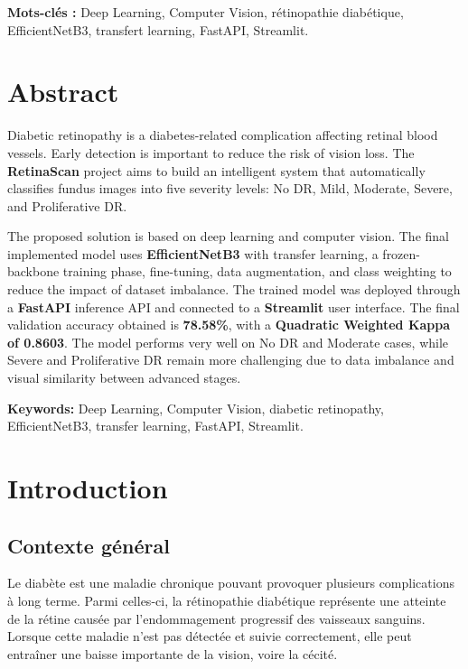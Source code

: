 \documentclass[12pt,a4paper]{report}
\begin{document}
\textbf{Mots-clés :} Deep Learning, Computer Vision, rétinopathie diabétique, EfficientNetB3, transfert learning, FastAPI, Streamlit.

\chapter*{Abstract}
Diabetic retinopathy is a diabetes-related complication affecting retinal blood vessels. Early detection is important to reduce the risk of vision loss. The \textbf{RetinaScan} project aims to build an intelligent system that automatically classifies fundus images into five severity levels: No DR, Mild, Moderate, Severe, and Proliferative DR.

The proposed solution is based on deep learning and computer vision. The final implemented model uses \textbf{EfficientNetB3} with transfer learning, a frozen-backbone training phase, fine-tuning, data augmentation, and class weighting to reduce the impact of dataset imbalance. The trained model was deployed through a \textbf{FastAPI} inference API and connected to a \textbf{Streamlit} user interface. The final validation accuracy obtained is \textbf{78.58\%}, with a \textbf{Quadratic Weighted Kappa of 0.8603}. The model performs very well on No DR and Moderate cases, while Severe and Proliferative DR remain more challenging due to data imbalance and visual similarity between advanced stages.

\textbf{Keywords:} Deep Learning, Computer Vision, diabetic retinopathy, EfficientNetB3, transfer learning, FastAPI, Streamlit.

\tableofcontents
\listoffigures
\listoftables
\newpage
{}

\chapter{Introduction}

\section{Contexte général}
Le diabète est une maladie chronique pouvant provoquer plusieurs complications à long terme. Parmi celles-ci, la rétinopathie diabétique représente une atteinte de la rétine causée par l'endommagement progressif des vaisseaux sanguins. Lorsque cette maladie n'est pas détectée et suivie correctement, elle peut entraîner une baisse importante de la vision, voire la cécité.
\end{document}
